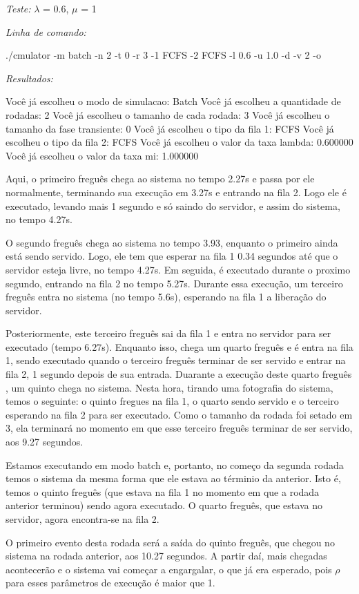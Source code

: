 \documentclass[a4paper,10pt]{article}
\begin{document}
\emph{Teste:} $\lambda$ = 0.6, $\mu$ = 1

\emph{Linha de comando:}

./cmulator -m batch -n 2 -t 0 -r 3 -1 FCFS -2 FCFS -l 0.6 -u 1.0 -d -v 2 -o

\emph{Resultados:}

Você já escolheu o modo de simulacao: Batch
Você já escolheu a quantidade de rodadas: 2
Você já escolheu o tamanho de cada rodada: 3
Você já escolheu o tamanho da fase transiente: 0
Você já escolheu o tipo da fila 1: FCFS
Você já escolheu o tipo da fila 2: FCFS
Você já escolheu o valor da taxa lambda: 0.600000
Você já escolheu o valor da taxa mi: 1.000000


    Aqui, o primeiro freguês chega ao sistema no tempo 2.27s e passa por ele normalmente, terminando sua execução em 3.27s e entrando na fila 2. Logo ele é executado, levando mais 1 segundo e só saindo do servidor, e assim do sistema, no tempo 4.27s.

    O segundo freguês chega ao sistema no tempo 3.93, enquanto o primeiro ainda está sendo servido. Logo, ele tem que esperar na fila 1 0.34 segundos até que o servidor esteja livre, no tempo 4.27s. Em seguida, é executado durante o proximo segundo, entrando na fila 2 no tempo 5.27s. Durante essa execução, um terceiro freguês entra no sistema (no tempo 5.6s), esperando na fila 1 a liberação do servidor.

    Posteriormente, este terceiro freguês sai da fila 1 e entra no servidor para ser executado (tempo 6.27s). Enquanto isso, chega um quarto freguês e é entra na fila 1, sendo executado quando o terceiro freguês terminar de ser servido e entrar na fila 2, 1 segundo depois de sua entrada. Duarante a execução deste quarto freguês , um quinto chega no sistema. Nesta hora, tirando uma fotografia do sistema, temos o seguinte: o quinto fregues na fila 1, o quarto sendo servido e o terceiro esperando na fila 2 para ser executado. Como o tamanho da rodada foi setado em 3, ela terminará no momento em que esse terceiro freguês terminar de ser servido, aos 9.27 segundos.

    Estamos executando em modo batch e, portanto, no começo da segunda rodada temos o sistema da mesma forma que ele estava ao términio da anterior. Isto é, temos o quinto freguês (que estava na fila 1 no momento em que a rodada anterior terminou) sendo agora executado. O quarto freguês, que estava no servidor, agora encontra-se na fila 2.

    O primeiro evento desta rodada será a saída do quinto freguês, que chegou no sistema na rodada anterior, aos 10.27 segundos. A partir daí, mais chegadas acontecerão e o sistema vai começar a engargalar, o que já era esperado, pois $\rho$ para esses parâmetros de execução é maior que 1.
\end{document}
